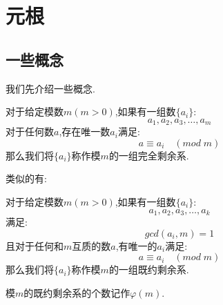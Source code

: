\documentclass[9pt]{beamer}
\begin{document}
	\section{元根}
		\subsection{一些概念}
		\begin{frame}
			我们先介绍一些概念.
			\begin{definition}[剩余系]
				对于给定模数$m(m > 0)$,如果有一组数$\{ a_i\}$:
				$$
					a_1, a_2, a_3,\dots, a_{m}
				$$
				对于任何数$a$,存在唯一数$a_i$满足:
				$$
					a \equiv a_i \quad (mod \; m)
				$$
				那么我们将$\{a_i\}$称作模$m$的一组完全剩余系.
			\end{definition}
			
		\end{frame}
		\begin{frame}
			类似的有:
			\begin{definition}[既约剩余系]
				对于给定模数$m(m > 0)$,如果有一组数$\{ a_i\}$:
				$$
					a_1, a_2, a_3,\dots, a_{k}
				$$
				满足:
				$$
					gcd(a_i,m) = 1
				$$
				且对于任何和$m$互质的数$a$,有唯一的$a_i$满足:
				$$
					a \equiv a_i \quad (mod \; m)
				$$
				那么我们将$\{a_i\}$称作模$m$的一组既约剩余系.
			\end{definition}
			
						\pause
			
			模$m$的既约剩余系的个数记作$\varphi(m)$.
		\end{frame}
\end{document}
